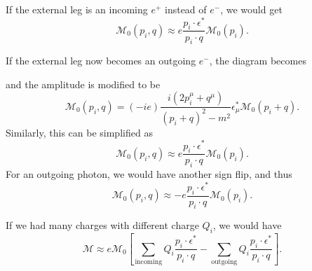 \documentclass[11pt]{article}
\theoremstyle{definition}
\begin{document}
If the external leg is an incoming $e^+$ instead of $e^-$, we would get
\begin{equation}
    \mathcal{M}_0(p_i,q) \approx e\frac{p_i \cdot \epsilon^*}{p_i \cdot q}\mathcal{M}_0(p_i).
\end{equation}

If the external leg now becomes an outgoing $e^-$, the diagram becomes
\begin{center}
\end{center}
and the amplitude is modified to be
\begin{equation}
    \mathcal{M}_0(p_i,q) = (-ie)\frac{i(2p_i^\mu+q^\mu)}{(p_i+q)^2 - m^2}\epsilon_\mu^*\mathcal{M}_0(p_i+q).
\end{equation}
Similarly, this can be simplified as
\begin{equation}
    \mathcal{M}_0(p_i,q) \approx e\frac{p_i \cdot \epsilon^*}{p_i \cdot q}\mathcal{M}_0(p_i).
\end{equation}
For an outgoing photon, we would have another sign flip, and thus
\begin{equation}
    \mathcal{M}_0(p_i,q) \approx -e\frac{p_i \cdot \epsilon^*}{p_i \cdot q}\mathcal{M}_0(p_i).
\end{equation}

If we had many charges with different charge $Q_i$, we would have
\begin{equation}
    \mathcal{M} \approx e\mathcal{M}_0\left[ \sum_\text{incoming}Q_i\frac{p_i \cdot \epsilon^*}{p_i \cdot q} - \sum_\text{outgoing}Q_i\frac{p_i \cdot \epsilon^*}{p_i \cdot q} \right].
\end{equation}
\end{document}

